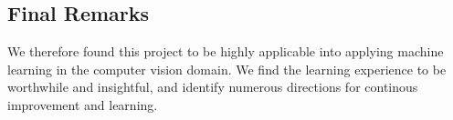 \documentclass{article}
\begin{document}
\subsection{Final Remarks}
We therefore found this project to be highly applicable into applying machine learning in the computer vision domain. We find the learning experience to be worthwhile and insightful, and identify numerous directions for continous improvement and learning. 








\end{document}
